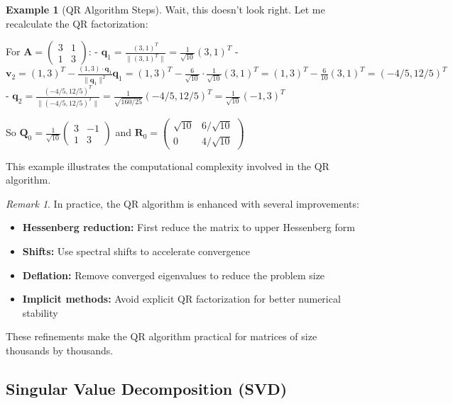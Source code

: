 \documentclass[12pt]{article}
\numberwithin{equation}{section}
\newcommand{\vect}[1]{\boldsymbol{#1}}   %
\newcommand{\mat}[1]{\mathbf{#1}}        %
\theoremstyle{plain}
\theoremstyle{definition}
\newtheorem{example}[theorem]{Example}
\theoremstyle{remark}
\newtheorem{remark}[theorem]{Remark}
\begin{document}
\begin{example}[QR Algorithm Steps]
Wait, this doesn't look right. Let me recalculate the QR factorization:

For $\mat{A} = \begin{pmatrix} 3 & 1 \\ 1 & 3 \end{pmatrix}$:
- $\vect{q}_1 = \frac{(3,1)^T}{\|(3,1)^T\|} = \frac{1}{\sqrt{10}}(3,1)^T$
- $\vect{v}_2 = (1,3)^T - \frac{(1,3) \cdot \vect{q}_1}{\|\vect{q}_1\|^2}\vect{q}_1 = (1,3)^T - \frac{6}{\sqrt{10}} \cdot \frac{1}{\sqrt{10}}(3,1)^T = (1,3)^T - \frac{6}{10}(3,1)^T = (-4/5, 12/5)^T$
- $\vect{q}_2 = \frac{(-4/5, 12/5)^T}{\|(-4/5, 12/5)^T\|} = \frac{1}{\sqrt{160/25}}(-4/5, 12/5)^T = \frac{1}{\sqrt{10}}(-1,3)^T$

So $\mat{Q}_0 = \frac{1}{\sqrt{10}}\begin{pmatrix} 3 & -1 \\ 1 & 3 \end{pmatrix}$ and $\mat{R}_0 = \begin{pmatrix} \sqrt{10} & 6/\sqrt{10} \\ 0 & 4/\sqrt{10} \end{pmatrix}$

This example illustrates the computational complexity involved in the QR algorithm.
\end{example}

\begin{remark}
In practice, the QR algorithm is enhanced with several improvements:
\begin{itemize}
\item \textbf{Hessenberg reduction:} First reduce the matrix to upper Hessenberg form
\item \textbf{Shifts:} Use spectral shifts to accelerate convergence
\item \textbf{Deflation:} Remove converged eigenvalues to reduce the problem size
\item \textbf{Implicit methods:} Avoid explicit QR factorization for better numerical stability
\end{itemize}
These refinements make the QR algorithm practical for matrices of size thousands by thousands.
\end{remark}

\subsection{Singular Value Decomposition (SVD)}
\end{document}
